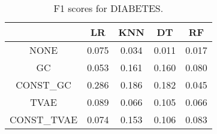 \begin{table}
\caption{F1 scores for DIABETES.}
\label{tab:f1-DIABETES}
\begin{tabular}{ccccc}
\toprule
 & LR & KNN & DT & RF \\
\midrule
NONE & 0.075 & 0.034 & 0.011 & 0.017 \\
GC & 0.053 & 0.161 & 0.160 & 0.080 \\
CONST\_GC & 0.286 & 0.186 & 0.182 & 0.045 \\
TVAE & 0.089 & 0.066 & 0.105 & 0.066 \\
CONST\_TVAE & 0.074 & 0.153 & 0.106 & 0.083 \\
\bottomrule
\end{tabular}
\end{table}
